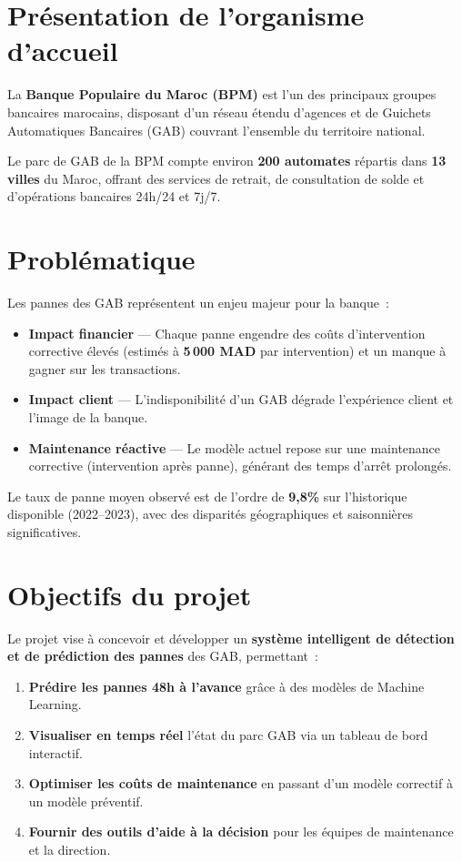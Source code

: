 \documentclass[a4paper,12pt]{report}
\begin{document}
\section{Présentation de l'organisme d'accueil}

La \textbf{Banque Populaire du Maroc (BPM)} est l'un des principaux groupes bancaires marocains, disposant d'un réseau étendu d'agences et de Guichets Automatiques Bancaires (GAB) couvrant l'ensemble du territoire national.

Le parc de GAB de la BPM compte environ \textbf{200 automates} répartis dans \textbf{13 villes} du Maroc, offrant des services de retrait, de consultation de solde et d'opérations bancaires 24h/24 et 7j/7.

\section{Problématique}

Les pannes des GAB représentent un enjeu majeur pour la banque~:

\begin{itemize}[leftmargin=2cm]
    \item \textbf{Impact financier} — Chaque panne engendre des coûts d'intervention corrective élevés (estimés à \textbf{5\,000 MAD} par intervention) et un manque à gagner sur les transactions.
    \item \textbf{Impact client} — L'indisponibilité d'un GAB dégrade l'expérience client et l'image de la banque.
    \item \textbf{Maintenance réactive} — Le modèle actuel repose sur une maintenance corrective (intervention après panne), générant des temps d'arrêt prolongés.
\end{itemize}

Le taux de panne moyen observé est de l'ordre de \textbf{9,8\%} sur l'historique disponible (2022–2023), avec des disparités géographiques et saisonnières significatives.

\section{Objectifs du projet}

Le projet vise à concevoir et développer un \textbf{système intelligent de détection et de prédiction des pannes} des GAB, permettant~:

\begin{enumerate}[leftmargin=2cm]
    \item \textbf{Prédire les pannes 48h à l'avance} grâce à des modèles de Machine Learning.
    \item \textbf{Visualiser en temps réel} l'état du parc GAB via un tableau de bord interactif.
    \item \textbf{Optimiser les coûts de maintenance} en passant d'un modèle correctif à un modèle préventif.
    \item \textbf{Fournir des outils d'aide à la décision} pour les équipes de maintenance et la direction.
\end{enumerate}
\end{document}
